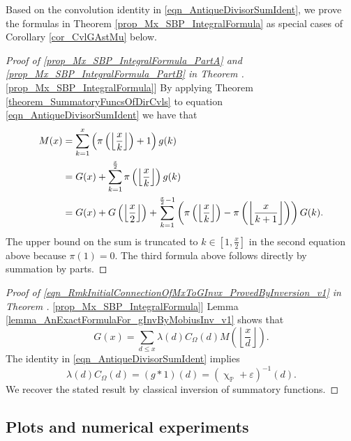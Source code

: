 \documentclass[11pt,reqno,a4letter]{article}
\newcommand{\hlocalref}[1]{\hyperref[#1]{\ref{#1}}}
\numberwithin{equation}{section}
\numberwithin{figure}{section}
\numberwithin{table}{section}
\renewcommand{\chi}{\upchi}
\newcommand{\Floor}[2]{\ensuremath{\left\lfloor \frac{#1}{#2} \right\rfloor}}
\theoremstyle{plain}
\numberwithin{theorem}{section}
\theoremstyle{definition}
\begin{document}
Based on the convolution identity in \eqref{eqn_AntiqueDivisorSumIdent}, 
we prove the formulas in 
Theorem \hlocalref{prop_Mx_SBP_IntegralFormula} as special cases of 
Corollary \hlocalref{cor_CvlGAstMu} below. 
 
\begin{proof}[Proof of 
              \eqref{prop_Mx_SBP_IntegralFormula_PartA} and \eqref{prop_Mx_SBP_IntegralFormula_PartB} in 
              Theorem \hlocalref{prop_Mx_SBP_IntegralFormula}] 
By applying Theorem \hlocalref{theorem_SummatoryFuncsOfDirCvls} to 
equation \eqref{eqn_AntiqueDivisorSumIdent} we have that 
\begin{align} 
\notag
M(x) & = \sum_{k=1}^{x} \left(\pi\left(\Floor{x}{k}\right)+1\right) g(k) \\ 
\notag 
     & = G(x) + \sum_{k=1}^{\frac{x}{2}} \pi\left(\Floor{x}{k}\right) g(k) \\ 
\notag 
     & = G(x) + G\left(\Floor{x}{2}\right) + 
     \sum_{k=1}^{\frac{x}{2}-1} \left( 
     \pi\left(\Floor{x}{k}\right) - \pi\left(\Floor{x}{k+1}\right) 
	\right) G(k).
\end{align} 
The upper bound on the sum is truncated to $k \in \left[1, \frac{x}{2}\right]$ in the second equation 
above because $\pi(1) = 0$. 
The third formula above follows directly by summation by parts. 
\end{proof} 
\begin{proof}[Proof of \eqref{eqn_RmkInitialConnectionOfMxToGInvx_ProvedByInversion_v1} in Theorem \hlocalref{prop_Mx_SBP_IntegralFormula}]
Lemma \hlocalref{lemma_AnExactFormulaFor_gInvByMobiusInv_v1} shows that 
\[
G(x) = \sum_{d \leq x} \lambda(d) C_{\Omega}(d) M\left(\Floor{x}{d}\right). 
\]
The identity in \eqref{eqn_AntiqueDivisorSumIdent} implies 
$$\lambda(d) C_{\Omega}(d) = (g \ast 1)(d) = (\chi_{\mathbb{P}} + \varepsilon)^{-1}(d).$$ 
We recover the stated result by classical inversion of summatory functions. 
\end{proof}

\subsection{Plots and numerical experiments}
\end{document}
